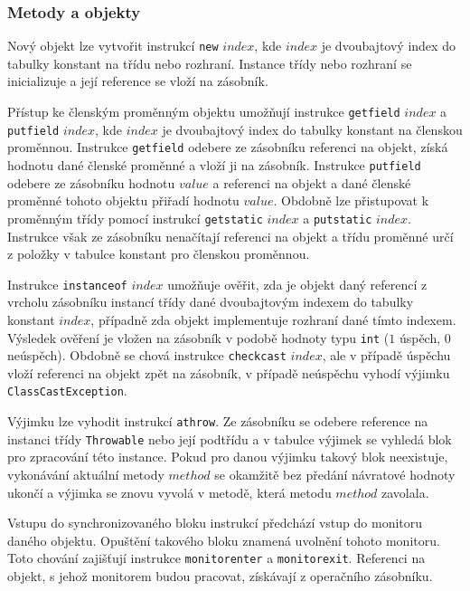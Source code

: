 \subsubsection{Metody a objekty}

Nový objekt lze vytvořit instrukcí \texttt{new} $index$, kde $index$ je dvoubajtový index do tabulky konstant na třídu nebo rozhraní. Instance třídy nebo rozhraní se inicializuje a její reference se vloží na zásobník.

Přístup ke členským proměnným objektu umožňují instrukce \texttt{getfield} $index$ a \texttt{putfield} $index$, kde $index$ je dvoubajtový index do tabulky konstant na členskou proměnnou. Instrukce \texttt{getfield} odebere ze zásobníku referenci na objekt, získá hodnotu dané členské proměnné a vloží ji na zásobník. Instrukce \texttt{putfield} odebere ze zásobníku hodnotu $value$ a referenci na objekt a dané členské proměnné tohoto objektu přiřadí hodnotu $value$. Obdobně lze přistupovat k proměnným třídy pomocí instrukcí \texttt{getstatic} $index$ a \texttt{putstatic} $index$. Instrukce však ze zásobníku nenačítají referenci na objekt a třídu proměnné určí z položky v tabulce konstant pro členskou proměnnou.



Instrukce \texttt{instanceof} $index$ umožňuje ověřit, zda je objekt daný referencí z vrcholu zásobníku instancí třídy dané dvoubajtovým indexem do tabulky konstant  $index$, případně zda objekt implementuje rozhraní dané tímto indexem. Výsledek ověření je vložen na zásobník v podobě hodnoty typu \texttt{int} ($1$ úspěch, $0$ neúspěch). Obdobně se chová instrukce \texttt{checkcast} $index$, ale v případě úspěchu vloží referenci na objekt zpět na zásobník, v případě neúspěchu vyhodí výjimku \texttt{ClassCastException}.


Výjimku lze vyhodit instrukcí \texttt{athrow}. Ze zásobníku se odebere reference na instanci třídy \texttt{Throwable} nebo její podtřídu a v tabulce výjimek se vyhledá blok pro zpracování této instance. Pokud pro danou výjimku takový blok neexistuje, vykonávání aktuální metody $method$ se okamžitě bez předání návratové hodnoty ukončí a výjimka se znovu vyvolá v metodě, která metodu $method$ zavolala. 


Vstupu do synchronizovaného bloku instrukcí předchází vstup do monitoru daného objektu. Opuštění takového bloku znamená uvolnění tohoto monitoru. Toto chování zajišťují instrukce \texttt{monitorenter} a \texttt{monitorexit}. Referenci na objekt, s jehož monitorem budou pracovat, získávají z operačního zásobníku.

